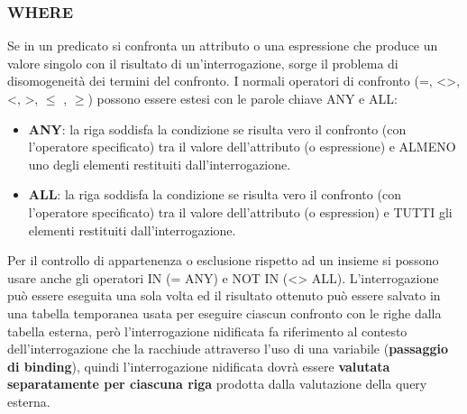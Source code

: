 \documentclass[a4paper,twoside]{article}
\begin{document}
\subsubsection{WHERE}
Se in un predicato si confronta un attributo o una espressione che produce un valore
singolo con il risultato di un’interrogazione, sorge il problema di disomogeneità dei termini
del confronto. I normali operatori di confronto (=, <>, <, >, $\le$ , $\ge$) possono
essere estesi con le parole chiave ANY e ALL:
\begin{itemize}
  \item \textbf{ANY}: la riga soddisfa la condizione se risulta vero il confronto
    (con l’operatore specificato) tra il valore dell’attributo (o espressione) e ALMENO uno
    degli elementi restituiti dall’interrogazione.

  \item \textbf{ALL}: la riga soddisfa la condizione se risulta vero il confronto
    (con l’operatore specificato) tra il valore dell’attributo (o espression) e TUTTI gli elementi restituiti dall’interrogazione.
\end{itemize}
Per il controllo di appartenenza o esclusione rispetto ad un insieme si possono usare anche
gli operatori IN (= ANY) e NOT IN (<> ALL).
L'interrogazione può essere eseguita una sola volta ed il risultato ottenuto può
essere salvato in una tabella temporanea usata per eseguire
ciascun confronto con le righe dalla tabella esterna, però  l’interrogazione nidificata
fa riferimento al contesto dell’interrogazione che la racchiude attraverso l’uso di una
variabile (\textbf{passaggio di binding}), quindi l'interrogazione nidificata
dovrà essere \textbf{valutata separatamente per ciascuna riga} prodotta dalla
valutazione della query esterna.
\end{document}
